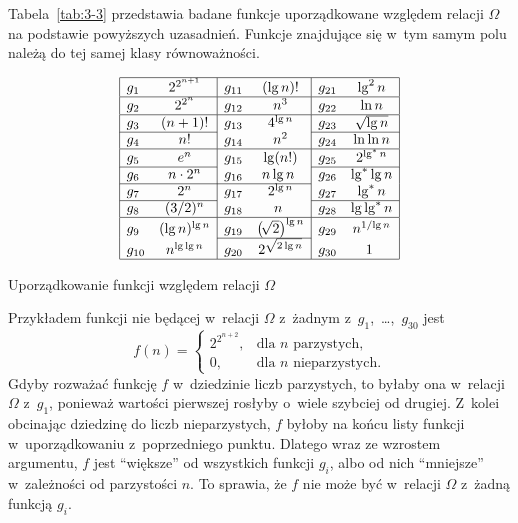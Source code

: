 Tabela~\ref{tab:3-3} przedstawia badane funkcje uporządkowane względem relacji $\Omega$ na podstawie powyższych uzasadnień. Funkcje znajdujące się w~tym samym polu należą do tej samej klasy równoważności.
\begin{table}[ht]
	\begin{center}
		\[
			\begin{array}{|lc|lc|lc|} \hline
				g_1 & 2^{2^{n+1}} & g_{11} & (\lg n)! & g_{21} & \lg^2n \\ \hline
				g_2 & 2^{2^n} & g_{12} & n^3 & g_{22} & \ln n \\ \hline
				g_3 & (n+1)! & g_{13} & 4^{\lg n} & g_{23} & \sqrt{\lg n} \\ \cline{1-2}\cline{5-6}
				g_4 & n! & g_{14} & n^2 & g_{24} & \ln\ln n \\ \hline
				g_5 & e^n & g_{15} & \lg (n!) & g_{25} & 2^{\lg^*n} \\ \cline{1-2}\cline{5-6}
				g_6 & n\cdot2^n & g_{16} & n\lg n~& g_{26} & \lg^*\lg n \\ \cline{1-4}
				g_7 & 2^n & g_{17} & 2^{\lg n} & g_{27} & \lg^*n \\ \cline{1-2}\cline{5-6}
				g_8 & (3/2)^n & g_{18} & n~& g_{28} & \lg\lg^*n \\ \hline
				g_9 & (\lg n)^{\lg n} & g_{19} & \bigl(\!\sqrt{2}\bigr)^{\lg n} & g_{29} & n^{1/\!\lg n} \\ \cline{3-4}
				g_{10} & n^{\lg\lg n} & g_{20} & 2^{\sqrt{2\lg n}} & g_{30} & 1~\\ \hline
			\end{array}
		\]
	\end{center}
	\caption{Uporządkowanie funkcji względem relacji $\Omega$} \label{tab:3-3}
\end{table}

\subexercise{} %
Przykładem funkcji nie będącej w~relacji $\Omega$ z~żadnym z~$g_1$,~\dots,~$g_{30}$ jest
\[
	f(n) =
	\begin{cases}
		2^{2^{n+2}}, & \text{dla $n$ parzystych,} \\
		0, & \text{dla $n$ nieparzystych}.
	\end{cases}
\]
Gdyby rozważać funkcję $f$ w~dziedzinie liczb parzystych, to byłaby ona w~relacji $\Omega$ z~$g_1$, ponieważ wartości pierwszej rosłyby o~wiele szybciej od drugiej. Z~kolei obcinając dziedzinę do liczb nieparzystych, $f$ byłoby na końcu listy funkcji w~uporządkowaniu z~poprzedniego punktu. Dlatego wraz ze wzrostem argumentu, $f$ jest ``większe'' od wszystkich funkcji $g_i$, albo od nich ``mniejsze'' w~zależności od parzystości $n$. To sprawia, że $f$ nie może być w~relacji $\Omega$ z~żadną funkcją $g_i$.

